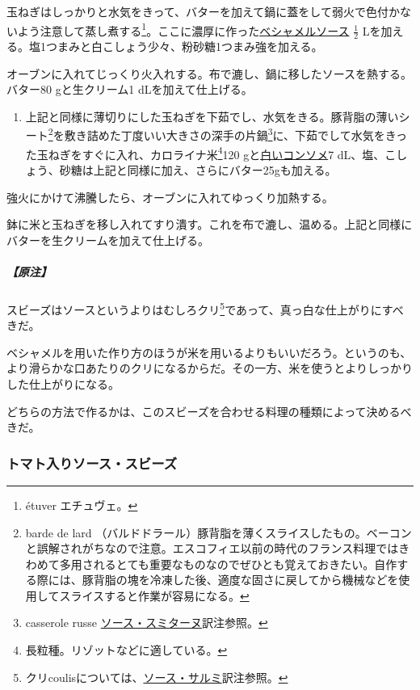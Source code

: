 \begin{recette}
玉ねぎはしっかりと水気をきって、バターを加えて鍋に蓋をして弱火で色付かないよう注意して蒸し煮する\footnote{étuver
  エチュヴェ。}。ここに濃厚に作った\protect\hyperlink{sauce-bechamel}{ベシャメルソース}
\(\frac{1}{2}\)
Lを加える。塩1つまみと白こしょう少々、粉砂糖1つまみ強を加える。

オーブンに入れてじっくり火入れする。布で漉し、鍋に移したソースを熱する。バター80
gと生クリーム1 dLを加えて仕上げる。

\begin{enumerate}
\def\labelenumi{\arabic{enumi}.}
\setcounter{enumi}{1}
\tightlist
\item
  上記と同様に薄切りにした玉ねぎを下茹でし、水気をきる。豚背脂の薄いシート\footnote{barde
    de lard
    （バルドドラール）豚背脂を薄くスライスしたもの。ベーコンと誤解されがちなので注意。エスコフィエ以前の時代のフランス料理ではきわめて多用されるとても重要なものなのでぜひとも覚えておきたい。自作する際には、豚背脂の塊を冷凍した後、適度な固さに戻してから機械などを使用してスライスすると作業が容易になる。}を敷き詰めた丁度いい大きさの深手の片鍋\footnote{casserole
    russe
    \protect\hyperlink{sauce-smitane}{ソース・スミターヌ}訳注参照。}に、下茹でして水気をきった玉ねぎをすぐに入れ、カロライナ米\footnote{長粒種。リゾットなどに適している。}120
  gと\protect\hyperlink{consomme-blanc}{白いコンソメ}7
  dL、塩、こしょう、砂糖は上記と同様に加え、さらにバター25gも加える。
\end{enumerate}

強火にかけて沸騰したら、オーブンに入れてゆっくり加熱する。

鉢に米と玉ねぎを移し入れてすり潰す。これを布で漉し、温める。上記と同様にバターを生クリームを加えて仕上げる。

\hypertarget{nota-sauce-soubise}{%
\subparagraph{【原注】}\label{nota-sauce-soubise}}

スビーズはソースというよりはむしろクリ\footnote{クリcoulisについては、\protect\hyperlink{sauce-salmis}{ソース・サルミ}訳注参照。}であって、真っ白な仕上がりにすべきだ。

ベシャメルを用いた作り方のほうが米を用いるよりもいいだろう。というのも、より滑らかな口あたりのクリになるからだ。その一方、米を使うとよりしっかりした仕上がりになる。

どちらの方法で作るかは、このスビーズを合わせる料理の種類によって決めるべきだ。

\hypertarget{sauce-soubise-tomatee}{%
\subsubsection{トマト入りソース・スビーズ}\label{sauce-soubise-tomatee}}


\end{recette}
